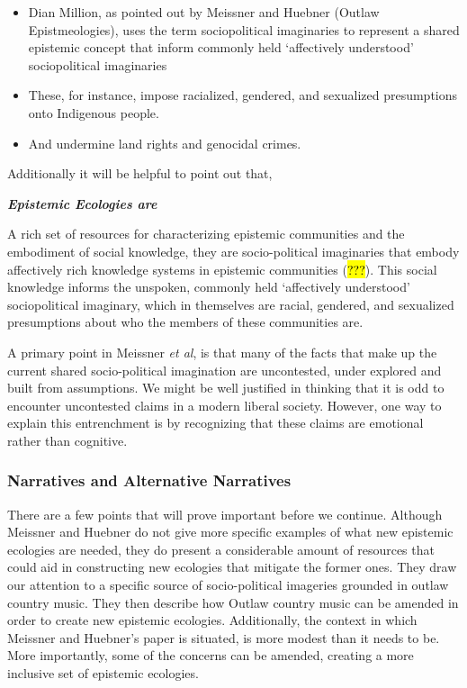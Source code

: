 \documentclass[
  letterpaper,
  DIV=11,
  numbers=noendperiod]{scrartcl}
\theoremstyle{remark}
\begin{document}
\begin{itemize}
\item
  Dian Million, as pointed out by Meissner and Huebner (Outlaw
  Epistmeologies), uses the term sociopolitical imaginaries to represent
  a shared epistemic concept that inform commonly held `affectively
  understood' sociopolitical imaginaries
\item
  These, for instance, impose racialized, gendered, and sexualized
  presumptions onto Indigenous people.
\item
  And undermine land rights and genocidal crimes.
\end{itemize}

Additionally it will be helpful to point out that,

\textbf{\emph{Epistemic Ecologies are}}

A rich set of resources for characterizing epistemic communities and the
embodiment of social knowledge, they are socio-political imaginaries
that embody affectively rich knowledge systems in epistemic communities
(\hl{???}). This social knowledge informs the unspoken, commonly held
`affectively understood' sociopolitical imaginary, which in themselves
are racial, gendered, and sexualized presumptions about who the members
of these communities are.

A primary point in Meissner \emph{et al}, is that many of the facts that
make up the current shared socio-political imagination are uncontested,
under explored and built from assumptions. We might be well justified in
thinking that it is odd to encounter uncontested claims in a modern
liberal society. However, one way to explain this entrenchment is by
recognizing that these claims are emotional rather than cognitive.

\subsubsection{Narratives and Alternative
Narratives}\label{narratives-and-alternative-narratives}

There are a few points that will prove important before we continue.
Although Meissner and Huebner do not give more specific examples of what
new epistemic ecologies are needed, they do present a considerable
amount of resources that could aid in constructing new ecologies that
mitigate the former ones. They draw our attention to a specific source
of socio-political imageries grounded in outlaw country music. They then
describe how Outlaw country music can be amended in order to create new
epistemic ecologies. Additionally, the context in which Meissner and
Huebner's paper is situated, is more modest than it needs to be. More
importantly, some of the concerns can be amended, creating a more
inclusive set of epistemic ecologies.
\end{document}

